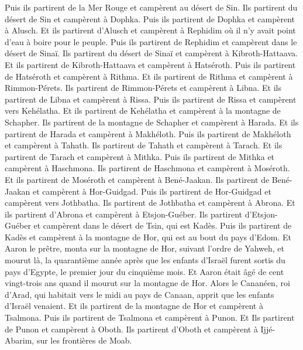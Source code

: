\begin{multicols}{2}
Puis ils partirent de la Mer Rouge et campèrent au désert de Sin.
Ils partirent du désert de Sin et campèrent à Dophka.
Puis ils partirent de Dophka et campèrent à Alusch.
Et ils partirent d'Alusch et campèrent à Rephidim où il n'y avait point d'eau à boire pour le peuple.
Puis ils partirent de Rephidim et campèrent dans le désert de Sinaï.
Ils partirent du désert de Sinaï et campèrent à Kibroth-Hattaava.
Et ils partirent de Kibroth-Hattaava et campèrent à Hatséroth.
Puis ils partirent de Hatséroth et campèrent à Rithma.
Et ils partirent de Rithma et campèrent à Rimmon-Pérets.
Ils partirent de Rimmon-Pérets et campèrent à Libna.
Et ils partirent de Libna et campèrent à Rissa.
Puis ils partirent de Rissa et campèrent vers Kehélatha.
Et ils partirent de Kehélatha et campèrent à la montagne de Schapher.
Ils partirent de la montagne de Schapher et campèrent à Harada.
Et ils partirent de Harada et campèrent à Makhéloth.
Puis ils partirent de Makhéloth et campèrent à Tahath.
Ils partirent de Tahath et campèrent à Tarach.
Et ils partirent de Tarach et campèrent à Mithka.
Puis ils partirent de Mithka et campèrent à Haschmona.
Ils partirent de Haschmona et campèrent à Moséroth.
Et ils partirent de Moséroth et campèrent à Bené-Jaakan.
Ils partirent de Bené-Jaakan et campèrent à Hor-Guidgad.
Puis ils partirent de Hor-Guidgad et campèrent vers Jothbatha.
Ils partirent de Jothbatha et campèrent à Abrona.
Et ils partirent d'Abrona et campèrent à Etsjon-Guéber.
Ils partirent d'Etsjon-Guéber et campèrent dans le désert de Tsin, qui est Kadès.
Puis ils partirent de Kadès et campèrent à la montagne de Hor, qui est au bout du pays d'Edom.
Et Aaron le prêtre, monta sur la montagne de Hor, suivant l'ordre de Yahweh, et mourut là, la quarantième année après que les enfants d'Israël furent sortis du pays d'Egypte, le premier jour du cinquième mois.
Et Aaron était âgé de cent vingt-trois ans quand il mourut sur la montagne de Hor.
Alors le Cananéen, roi d'Arad, qui habitait vers le midi au pays de Canaan, apprit que les enfants d'Israël venaient.
Et ils partirent de la montagne de Hor et campèrent à Tsalmona.
Puis ils partirent de Tsalmona et campèrent à Punon.
Et Ils partirent de Punon et campèrent à Oboth.
Ils partirent d'Oboth et campèrent à Ijjé-Abarim, sur les frontières de Moab.

\end{multicols}
